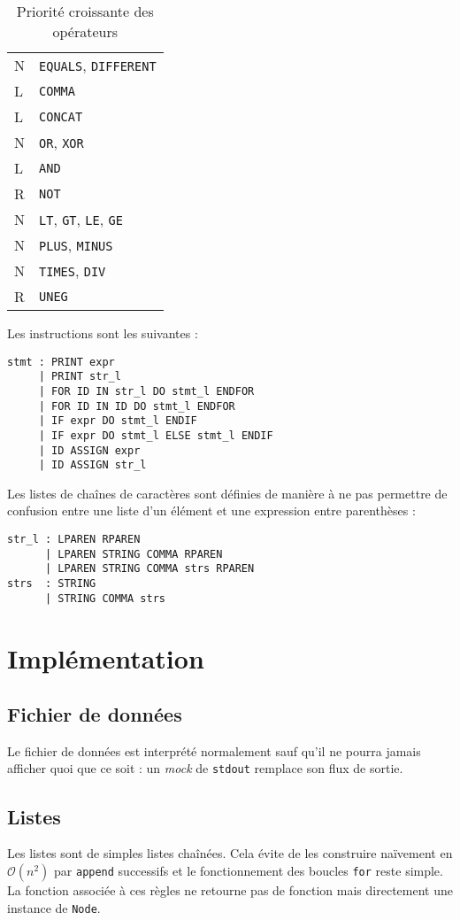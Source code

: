 \documentclass[12pt,twocolumn]{article}
\newcommand{\bigO}{\mathcal{O}}
\begin{document}
\begin{table}
\center
\begin{tabular}{l|l}
	N & \texttt{EQUALS}, \texttt{DIFFERENT} \\
	L & \texttt{COMMA} \\
	L & \texttt{CONCAT} \\
	N & \texttt{OR}, \texttt{XOR} \\
	L & \texttt{AND} \\
	R & \texttt{NOT} \\
	N & \texttt{LT}, \texttt{GT}, \texttt{LE}, \texttt{GE} \\
	N & \texttt{PLUS}, \texttt{MINUS} \\
	N & \texttt{TIMES}, \texttt{DIV} \\
	R & \texttt{UNEG}
\end{tabular}
\caption{Priorité croissante des opérateurs}
\label{tab:prio}
\end{table}

Les instructions sont les suivantes :
\begin{verbatim}
stmt : PRINT expr
     | PRINT str_l
     | FOR ID IN str_l DO stmt_l ENDFOR
     | FOR ID IN ID DO stmt_l ENDFOR
     | IF expr DO stmt_l ENDIF
     | IF expr DO stmt_l ELSE stmt_l ENDIF
     | ID ASSIGN expr
     | ID ASSIGN str_l
\end{verbatim}

Les listes de chaînes de caractères sont définies de manière à ne pas permettre
de confusion entre une liste d'un élément et une expression entre parenthèses :
\begin{verbatim}
str_l : LPAREN RPAREN
      | LPAREN STRING COMMA RPAREN
      | LPAREN STRING COMMA strs RPAREN
strs  : STRING
      | STRING COMMA strs
\end{verbatim}


\section{Implémentation}
\subsection{Fichier de données}
Le fichier de données est interprété normalement sauf qu'il ne pourra jamais
afficher quoi que ce soit : un \textit{mock} de \texttt{stdout} remplace son
flux de sortie.


\subsection{Listes}
Les listes sont de simples listes chaînées. Cela évite de les construire
naïvement en $\bigO(n^2)$ par \texttt{append} successifs et le fonctionnement
des boucles \texttt{for} reste simple. La fonction associée à ces règles
ne retourne pas de fonction mais directement une instance de \texttt{Node}.
\end{document}
